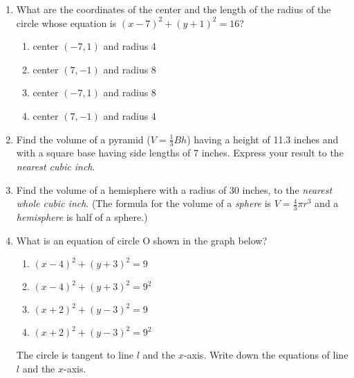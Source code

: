 \begin{enumerate}
\item What are the coordinates of the center and the length of the radius of the circle whose equation is $(x-7)^2+(y+1)^2=16$?
  \begin{enumerate}[itemsep=0.25cm]
    \item center $(-7,1)$ and radius 4
    \item center $(7,-1)$ and radius 8
    \item center $(-7,1)$ and radius 8
    \item center $(7,-1)$ and radius 4
  \end{enumerate}

\item Find the volume of a pyramid ($V=\frac{1}{3}Bh$) having a height of 11.3 inches and with a square base having side lengths of 7 inches. Express your result to the \emph{nearest cubic inch}. \vspace{5cm}

\item Find the volume of a hemisphere with a radius of 30 inches, to the \emph{nearest whole cubic inch}. (The formula for the volume of a \emph{sphere} is $V=\frac{4}{3}\pi r^3$ and a \emph{hemisphere} is half of a sphere.) \vspace{5cm}

\item What is an equation of circle O shown in the graph below?
  \begin{center}
  \end{center}
  \begin{multicols}{2}
    \begin{enumerate}
      \item $(x-4)^2+(y+3)^2=9$
      \item $(x-4)^2+(y+3)^2=9^2$
      \item $(x+2)^2+(y-3)^2=9$
      \item $(x+2)^2+(y-3)^2=9^2$
    \end{enumerate}
  \end{multicols}
  The circle is tangent to line $l$ and the $x$-axis. Write down the equations of line $l$ and the $x$-axis.


\end{enumerate}
